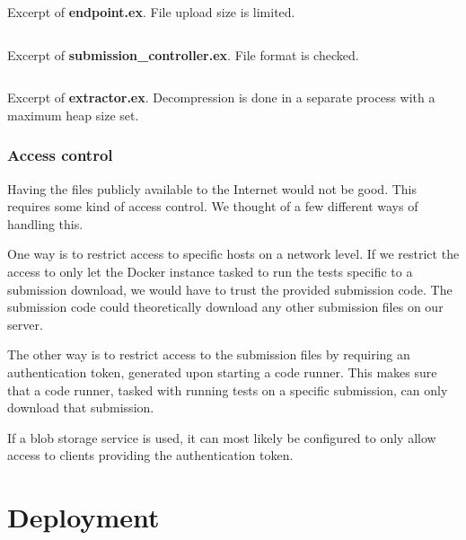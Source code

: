 \begin{listing}
    \inputminted[firstline=43,lastline=46]{elixir}{code/server/lib/thesis_web/endpoint.ex}
    \caption{Excerpt of \textbf{endpoint.ex}. File upload size is limited.}
    \label{lst:parsers_upload_limit}
\end{listing}

\begin{listing}
    \inputminted[firstline=73,lastline=82]{elixir}{code/server/lib/thesis_web/controllers/submission_controller.ex}
    \caption{Excerpt of \textbf{submission\_controller.ex}. File format is checked.}
    \label{lst:upload_file_format_check}
\end{listing}

\begin{listing}
    \inputminted[firstline=77,lastline=100]{elixir}{code/server/lib/thesis/extractor.ex}
    \caption{Excerpt of \textbf{extractor.ex}. Decompression is done in a separate process with a maximum heap size set.}
    \label{lst:decompression_limit}
\end{listing}

\subsubsection*{Access control}

Having the files publicly available to the Internet would not be good. This requires some kind of access control. We thought of a few different ways of handling this.

One way is to restrict access to specific hosts on a network level. If we restrict the access to only let the Docker instance tasked to run the tests specific to a submission download, we would have to trust the provided submission code. The submission code could theoretically download any other submission files on our server.

The other way is to restrict access to the submission files by requiring an authentication token, generated upon starting a code runner. This makes sure that a code runner, tasked with running tests on a specific submission, can only download that submission.

If a blob storage service is used, it can most likely be configured to only allow access to clients providing the authentication token.

\newpage
\section{Deployment}

